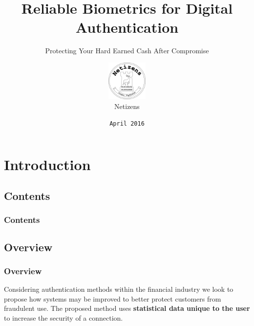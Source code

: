 \documentclass{beamer}
\title[Crisis]{Reliable Biometrics for Digital Authentication}
\subtitle{Protecting Your Hard Earned Cash After Compromise}
\author{
  \includegraphics[height=2cm,width=2cm]{logo-black}
  \\
  Netizens
}
\institute{
  \inst{1}
  Cyber Security
  \\
  Computer Science
  \\
  University of Hertfordshire
}
\date{\texttt{\footnotesize April 2016}}
\begin{document}
  \section*{}
    \frame{\titlepage}
  \section{Introduction}
    \subsection{Contents}
      \begin{frame}
        \frametitle{Contents}
        \tableofcontents[hideallsubsections]
      \end{frame}
    \subsection{Overview}
      \begin{frame}
        \frametitle{Overview}
        Considering authentication methods within the financial industry we look
        to propose how systems may be improved to better protect customers from
        fraudulent use. The proposed method uses \textbf{statistical data unique
        to the user} to increase the security of a connection.
      \end{frame}
\end{document}
